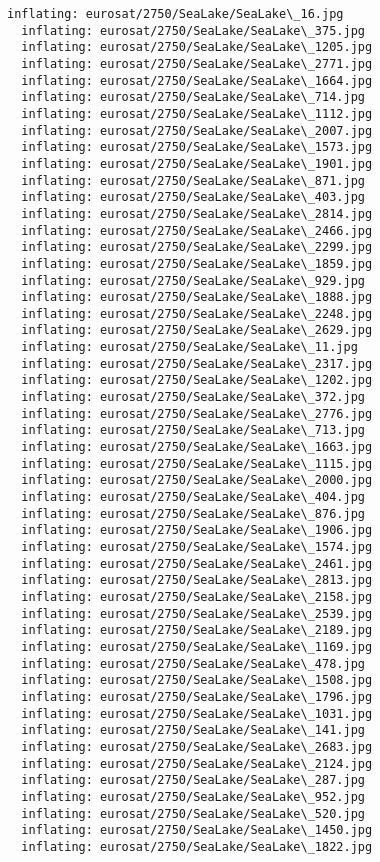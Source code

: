 \documentclass[11pt]{article}
\begin{document}
\begin{Verbatim}[commandchars=\\\{\}]
  inflating: eurosat/2750/SeaLake/SeaLake\_16.jpg
  inflating: eurosat/2750/SeaLake/SeaLake\_375.jpg
  inflating: eurosat/2750/SeaLake/SeaLake\_1205.jpg
  inflating: eurosat/2750/SeaLake/SeaLake\_2771.jpg
  inflating: eurosat/2750/SeaLake/SeaLake\_1664.jpg
  inflating: eurosat/2750/SeaLake/SeaLake\_714.jpg
  inflating: eurosat/2750/SeaLake/SeaLake\_1112.jpg
  inflating: eurosat/2750/SeaLake/SeaLake\_2007.jpg
  inflating: eurosat/2750/SeaLake/SeaLake\_1573.jpg
  inflating: eurosat/2750/SeaLake/SeaLake\_1901.jpg
  inflating: eurosat/2750/SeaLake/SeaLake\_871.jpg
  inflating: eurosat/2750/SeaLake/SeaLake\_403.jpg
  inflating: eurosat/2750/SeaLake/SeaLake\_2814.jpg
  inflating: eurosat/2750/SeaLake/SeaLake\_2466.jpg
  inflating: eurosat/2750/SeaLake/SeaLake\_2299.jpg
  inflating: eurosat/2750/SeaLake/SeaLake\_1859.jpg
  inflating: eurosat/2750/SeaLake/SeaLake\_929.jpg
  inflating: eurosat/2750/SeaLake/SeaLake\_1888.jpg
  inflating: eurosat/2750/SeaLake/SeaLake\_2248.jpg
  inflating: eurosat/2750/SeaLake/SeaLake\_2629.jpg
  inflating: eurosat/2750/SeaLake/SeaLake\_11.jpg
  inflating: eurosat/2750/SeaLake/SeaLake\_2317.jpg
  inflating: eurosat/2750/SeaLake/SeaLake\_1202.jpg
  inflating: eurosat/2750/SeaLake/SeaLake\_372.jpg
  inflating: eurosat/2750/SeaLake/SeaLake\_2776.jpg
  inflating: eurosat/2750/SeaLake/SeaLake\_713.jpg
  inflating: eurosat/2750/SeaLake/SeaLake\_1663.jpg
  inflating: eurosat/2750/SeaLake/SeaLake\_1115.jpg
  inflating: eurosat/2750/SeaLake/SeaLake\_2000.jpg
  inflating: eurosat/2750/SeaLake/SeaLake\_404.jpg
  inflating: eurosat/2750/SeaLake/SeaLake\_876.jpg
  inflating: eurosat/2750/SeaLake/SeaLake\_1906.jpg
  inflating: eurosat/2750/SeaLake/SeaLake\_1574.jpg
  inflating: eurosat/2750/SeaLake/SeaLake\_2461.jpg
  inflating: eurosat/2750/SeaLake/SeaLake\_2813.jpg
  inflating: eurosat/2750/SeaLake/SeaLake\_2158.jpg
  inflating: eurosat/2750/SeaLake/SeaLake\_2539.jpg
  inflating: eurosat/2750/SeaLake/SeaLake\_2189.jpg
  inflating: eurosat/2750/SeaLake/SeaLake\_1169.jpg
  inflating: eurosat/2750/SeaLake/SeaLake\_478.jpg
  inflating: eurosat/2750/SeaLake/SeaLake\_1508.jpg
  inflating: eurosat/2750/SeaLake/SeaLake\_1796.jpg
  inflating: eurosat/2750/SeaLake/SeaLake\_1031.jpg
  inflating: eurosat/2750/SeaLake/SeaLake\_141.jpg
  inflating: eurosat/2750/SeaLake/SeaLake\_2683.jpg
  inflating: eurosat/2750/SeaLake/SeaLake\_2124.jpg
  inflating: eurosat/2750/SeaLake/SeaLake\_287.jpg
  inflating: eurosat/2750/SeaLake/SeaLake\_952.jpg
  inflating: eurosat/2750/SeaLake/SeaLake\_520.jpg
  inflating: eurosat/2750/SeaLake/SeaLake\_1450.jpg
  inflating: eurosat/2750/SeaLake/SeaLake\_1822.jpg

\end{Verbatim}
\end{document}

